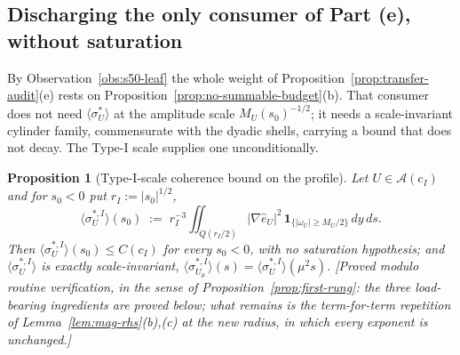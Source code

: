 \documentclass[11pt]{article}
\newtheorem{proposition}[theorem]{Proposition}
\theoremstyle{definition}
\theoremstyle{remark}
\begin{document}
\subsection{Discharging the only consumer of Part (e), without saturation}
\label{subsec:s50-typeI-scale}

By Observation~\ref{obs:s50-leaf} the whole weight of
Proposition~\ref{prop:transfer-audit}(e) rests on
Proposition~\ref{prop:no-summable-budget}(b). That consumer does not need
$\langle\sigma^*_U\rangle$ at the amplitude scale $M_U(s_0)^{-1/2}$; it needs
a scale-invariant cylinder family, commensurate with the dyadic shells,
carrying a bound that does not decay. The Type-I scale supplies one
unconditionally.

\begin{proposition}[Type-I-scale coherence bound on the profile]
  \label{prop:s50-typeI-scale}
  Let $U\in\mathcal{A}(c_I)$ and for $s_0<0$ put $r_I:=|s_0|^{1/2}$,
  \[
    \langle\sigma^{*,I}_U\rangle(s_0)
      \;:=\; r_I^{-3}\iint_{Q(r_I/2)} |\nabla\hat e_U|^2\,
        \mathbf{1}_{\{|\omega_U|\geq M_U/2\}}\,dy\,ds .
  \]
  Then $\langle\sigma^{*,I}_U\rangle(s_0)\leq C(c_I)$ for every $s_0<0$, with
  no saturation hypothesis; and $\langle\sigma^{*,I}_U\rangle$ is exactly
  scale-invariant, $\langle\sigma^{*,I}_{U_\mu}\rangle(s)
  =\langle\sigma^{*,I}_U\rangle(\mu^2s)$.
  \emph{[Proved modulo routine verification, in the sense of
  Proposition~\ref{prop:first-rung}: the three load-bearing ingredients are
  proved below; what remains is the term-for-term repetition of
  Lemma~\ref{lem:mag-rhs}(b),(c) at the new radius, in which every exponent
  is unchanged.]}
\end{proposition}
\end{document}
